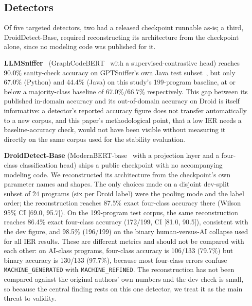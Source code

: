 \documentclass[sigconf,review,anonymous]{acmart}
\begin{document}
\subsection{Detectors}

Of five targeted detectors, two had a released checkpoint runnable as-is; a third, DroidDetect-Base, required reconstructing its architecture from the checkpoint alone, since no modeling code was published for it.

\textbf{LLMSniffer}~\cite{llmsniffer} (GraphCodeBERT~\cite{graphcodebert} with a supervised-contrastive head) reaches 90.0\% sanity-check accuracy on GPTSniffer's own Java test subset~\cite{gptsniffer}, but only 67.0\% (Python) and 44.4\% (Java) on this study's 199-program baseline, at or below a majority-class baseline of 67.0\%/66.7\% respectively. This gap between its published in-domain accuracy and its out-of-domain accuracy on Droid is itself informative: a detector's reported accuracy figure does not transfer automatically to a new corpus, and this paper's methodological point, that a low IER needs a baseline-accuracy check, would not have been visible without measuring it directly on the same corpus used for the stability evaluation.

\textbf{DroidDetect-Base} (ModernBERT-base~\cite{modernbert} with a projection layer and a four-class classification head) ships a public checkpoint with no accompanying modeling code. We reconstructed its architecture from the checkpoint's own parameter names and shapes. The only choices made on a disjoint dev-split subset of 24 programs (six per Droid label) were the pooling mode and the label order; the reconstruction reaches 87.5\% exact four-class accuracy there (Wilson 95\% CI [69.0, 95.7]). On the 199-program test corpus, the same reconstruction reaches 86.4\% exact four-class accuracy (172/199, CI [81.0, 90.5]), consistent with the dev figure, and 98.5\% (196/199) on the binary human-versus-AI collapse used for all IER results. These are different metrics and should not be compared with each other: on AI-class programs, four-class accuracy is 106/133 (79.7\%) but binary accuracy is 130/133 (97.7\%), because most four-class errors confuse \texttt{MACHINE\_GENERATED} with \texttt{MACHINE\_REFINED}. The reconstruction has not been compared against the original authors' own numbers and the dev check is small, so because the central finding rests on this one detector, we treat it as the main threat to validity.
\end{document}
